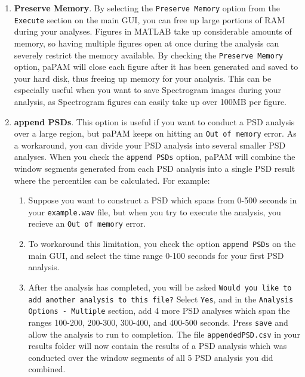 \documentclass[11pt]{report}
\begin{document}
\begin{enumerate}
\item \textbf{Preserve Memory}.
By selecting the \texttt{Preserve Memory} option from the \texttt{Execute} section on the main GUI, you can free up large portions of RAM during your analyses. Figures in MATLAB take up considerable amounts of memory, so having multiple figures open at once during the analysis can severely restrict the memory available.  By checking the \texttt{Preserve Memory} option, paPAM will close each figure after it has been  generated and saved to your hard disk, thus freeing up memory for your analysis.  This can be especially useful when you want to save Spectrogram images during your analysis, as Spectrogram figures can easily take up over 100MB per figure.

\item \textbf{append PSDs}.
This option is useful if you want to conduct a PSD analysis over a large region, but paPAM keeps on hitting an
\texttt{Out of memory} error.  As a workaround, you can divide your PSD analysis into several smaller PSD analyses.  When you check the \texttt{append PSDs} option, paPAM will combine the window segments generated from each PSD analysis into a single PSD result where the percentiles can be calculated.  For example:

\begin{enumerate}

\item Suppose you want to construct a PSD which spans from 0-500 seconds in your \texttt{example.wav} file, but when you try to execute the analysis, you recieve an \texttt{Out of memory} error.

\item To workaround this limitation, you check the option \texttt{append PSDs} on the main GUI, and select the time range 0-100 seconds for your first PSD analysis.

\item After the analysis has completed, you will be asked \texttt{Would you like to add another analysis to this file?}  Select \texttt{Yes}, and in the \texttt{Analysis Options - Multiple} section, add 4 more PSD analyses which span the ranges 100-200, 200-300, 300-400, and 400-500 seconds.  Press \texttt{save} and allow the analysis to run to completion.  The file \texttt{appendedPSD.csv} in your results folder will now contain the results of a PSD analysis which was conducted over the window segments of all 5 PSD analysis you did combined.


\end{enumerate}
\end{enumerate}
\end{document}
